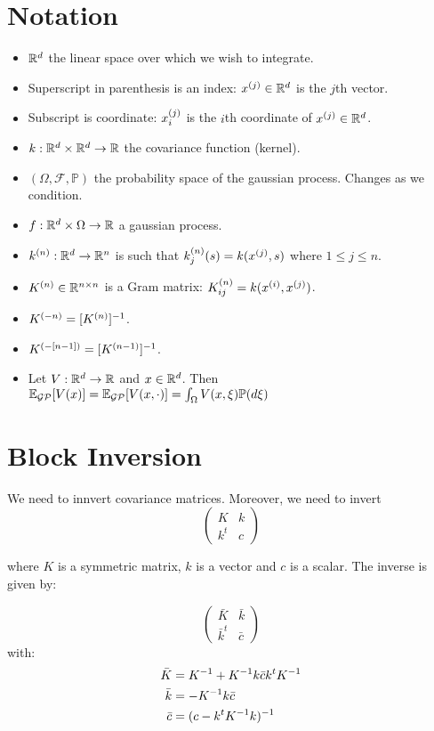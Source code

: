 \section{Notation}
\begin{itemize}
 \item $\mathbb{R}^d$ the linear space over which we wish to integrate.
 \item Superscript in parenthesis is an index: $x^{(j)} \in \mathbb{R}^d$ is the $j$th vector.
 \item Subscript is coordinate: $x^{(j)}_i$ is the $i$th coordinate of $x^{(j)} \in \mathbb{R}^d$.
 \item $k: \mathbb{R} ^d \times \mathbb{R} ^d \to \mathbb{R}$ the covariance function (kernel).
 \item $(\Omega, \mathcal{F}, \mathbb{P})$ the probability space of the gaussian process. Changes as we condition.
 \item $f : \mathbb{R}^d \times \Omega \to \mathbb{R}$ a gaussian process.
 \item $k^{(n)}: \mathbb{R}^d \to \mathbb{R}^n$ is such that $k^{(n)}_j(s) = k(x^{(j)} , s)$ where $1 \leq j \leq n$. 
 \item $K^{(n)} \in \mathbb{R}^{ n\times n} $ is a Gram matrix: $K^{(n)}_{ij} = k(x^{(i)} , x^{(j)})$.
 \item $K^{(-n)} = [K^{(n)}]^{-1}$.
 \item $K^{(-[n-1])} = [K^{(n-1)}]^{-1}$.
 \item Let $V: \mathbb{R}^d \to \mathbb{R}$ and $x \in \mathbb{R}^d$. Then $\mathbb{E}_{\mathcal{GP}}[ V(x) ]=\mathbb{E}_{\mathcal{GP}} [V(x, \cdot)] =  \int_{\Omega} V(x, \xi) \mathbb{P}(d\xi) $
\end{itemize}


\section{Block Inversion}
We need to innvert covariance matrices. Moreover, we need to invert
$$ \left( \begin{array}{cc}
K   & k \\
k^t & c \end{array} \right)
$$

where $K$ is a symmetric matrix, $k$ is a vector and $c$ is a scalar.
The inverse is given by:

$$ \left( \begin{array}{cc}
\bar{K}   &  \bar{k} \\
\bar{k}^t   &  \bar{c} \end{array} \right)
$$
with:
\begin{align}
 \begin{split}
\bar{K} &=  K^{-1} + K^{-1}k\bar{c}k^tK^{-1}\\
\bar{k} &=  -K^{-1} k\bar{c}\\
\bar{c} &= (c - k^tK^{-1} k)^{-1} 
 \end{split}
\end{align}

